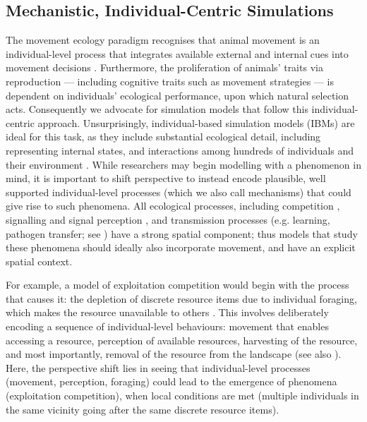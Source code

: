 \subsection*{Mechanistic, Individual-Centric Simulations}

The movement ecology paradigm recognises that animal movement is an individual-level process that integrates available external and internal cues into movement decisions \parencite{nathan2008a,holyoak2008}.
Furthermore, the proliferation of animals' traits via reproduction --- including cognitive traits such as movement strategies --- is dependent on individuals' ecological performance, upon which natural selection acts.
Consequently we advocate for simulation models that follow this individual-centric approach.
Unsurprisingly, individual-based simulation models (IBMs) are ideal for this task, as they include substantial ecological detail, including representing internal states, and interactions among hundreds of individuals and their environment \parencite{huston1988,deangelis2005,deangelis2018,deangelis2019}.
While researchers may begin modelling with a phenomenon in mind, it is important to shift perspective to instead encode plausible, well supported individual-level processes (which we also call mechanisms) that could give rise to such phenomena.
All ecological processes, including competition \parencite{keddy2001}, signalling and signal perception \parencite{torney2011}, and transmission processes (e.g. learning, pathogen transfer; see \cite{cantor2021,romano2021}) have a strong spatial component; thus models that study these phenomena should ideally also incorporate movement, and have an explicit spatial context.

For example, a model of exploitation competition would begin with the process that causes it: the depletion of discrete resource items due to individual foraging, which makes the resource unavailable to others \parencite[][; see Fig.~\ref{fig:intro_concepts}A]{keddy2001}.
This involves deliberately encoding a sequence of individual-level behaviours: movement that enables accessing a resource, perception of available resources, harvesting of the resource, and most importantly, removal of the resource from the landscape (see also \cite{spiegel2017,gupte2021a,gupte2022c}).
Here, the perspective shift lies in seeing that individual-level processes (movement, perception, foraging) could lead to the emergence of phenomena (exploitation competition), when local conditions are met (multiple individuals in the same vicinity going after the same discrete resource items).

